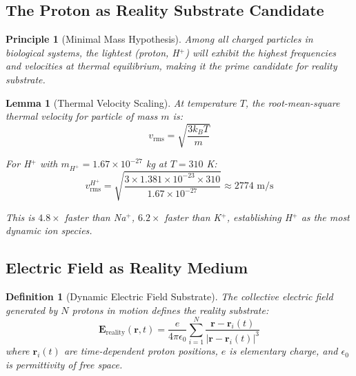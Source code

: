 \documentclass[12pt,a4paper]{article}
\newtheorem{lemma}[theorem]{Lemma}
\newtheorem{definition}[theorem]{Definition}
\newtheorem{principle}[theorem]{Principle}
\begin{document}
\subsection{The Proton as Reality Substrate Candidate}

\begin{principle}[Minimal Mass Hypothesis]
Among all charged particles in biological systems, the lightest (proton, H$^+$) will exhibit the highest frequencies and velocities at thermal equilibrium, making it the prime candidate for reality substrate.
\end{principle}

\begin{lemma}[Thermal Velocity Scaling]\label{lem:thermal-velocity}
At temperature $T$, the root-mean-square thermal velocity for particle of mass $m$ is:
\begin{equation}
v_{\text{rms}} = \sqrt{\frac{3k_B T}{m}}
\end{equation}

For H$^+$ with $m_{H^+} = 1.67 \times 10^{-27}$ kg at $T = 310$ K:
\begin{equation}
v_{\text{rms}}^{H^+} = \sqrt{\frac{3 \times 1.381 \times 10^{-23} \times 310}{1.67 \times 10^{-27}}} \approx 2774 \text{ m/s}
\end{equation}

This is $4.8\times$ faster than Na$^+$, $6.2\times$ faster than K$^+$, establishing H$^+$ as the most dynamic ion species.
\end{lemma}

\subsection{Electric Field as Reality Medium}

\begin{definition}[Dynamic Electric Field Substrate]
The collective electric field generated by $N$ protons in motion defines the reality substrate:
\begin{equation}
\mathbf{E}_{\text{reality}}(\mathbf{r}, t) = \frac{e}{4\pi\epsilon_0} \sum_{i=1}^{N} \frac{\mathbf{r} - \mathbf{r}_i(t)}{|\mathbf{r} - \mathbf{r}_i(t)|^3}
\end{equation}
where $\mathbf{r}_i(t)$ are time-dependent proton positions, $e$ is elementary charge, and $\epsilon_0$ is permittivity of free space.
\end{definition}
\end{document}
